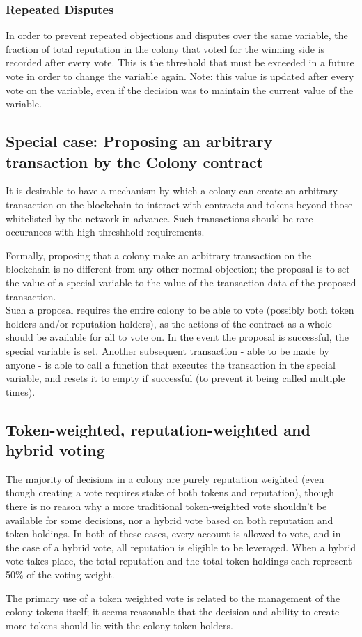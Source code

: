 \subsubsection{Repeated Disputes}\label{sec:repeated-disputes}
In order to prevent repeated objections and disputes over the same variable, the fraction of total reputation in the colony that voted for the winning side is recorded after every vote. This is the threshold that must be exceeded in a future vote in order to change the variable again. Note: this value is updated after every vote on the variable, even if the decision was to maintain the current value of the variable.



\subsection{Special case: Proposing an arbitrary transaction by the Colony contract}\label{sec:arbitrary-transaction}
It is desirable to have a mechanism by which a colony can create an arbitrary transaction on the blockchain to interact with contracts and tokens beyond those whitelisted by the network in advance. Such transactions should be rare occurances with high threshhold requirements.

Formally, proposing that a colony make an arbitrary transaction on the blockchain is no different from any other normal objection; the proposal is to set the value of a special variable to the value of the transaction data of the proposed transaction.\\
Such a proposal requires the entire colony to be able to vote (possibly both token holders and/or reputation holders), as the actions of the contract as a whole should be available for all to vote on. In the event the proposal is successful, the special variable is set. Another subsequent transaction - able to be made by anyone - is able to call a function that executes the transaction in the special variable, and resets it to empty if successful (to prevent it being called multiple times).

\subsection{Token-weighted, reputation-weighted and hybrid voting}
The majority of decisions in a colony are purely reputation weighted (even though creating a vote requires stake of both tokens and reputation), though there is no reason why a more traditional token-weighted vote shouldn't be available for some decisions, nor a hybrid vote based on both reputation and token holdings. In both of these cases, every account is allowed to vote, and in the case of a hybrid vote, all reputation is eligible to be leveraged. When a hybrid vote takes place, the total reputation and the total token holdings each represent 50\% of the voting weight.

The primary use of a token weighted vote is related to the management of the colony tokens itself; it seems reasonable that the decision and ability to create more tokens should lie with the colony token holders.
